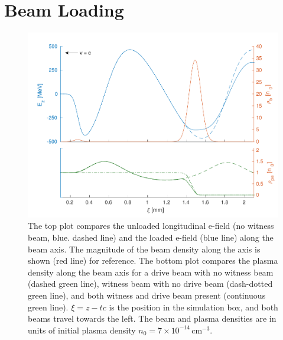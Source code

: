 \documentclass[aps,prstab,reprint,amsmath,amssymb,groupedaddress]{revtex4-1}
\newcommand{\unit}[1]{\,\mathrm{#1}}
\newcommand{\nexp}[1]{\times 10^{#1}}
\begin{document}
\section{Beam Loading}\label{S:BL}

\begin{figure}[hbt]
    \includegraphics[width=\linewidth,trim={2mm 0mm 2mm 0mm},clip]{figures/beamLoading}
    \caption{\label{Fig:BeamLoading} The top plot compares the unloaded longitudinal e-field (no witness beam, blue.
        dashed line) and the loaded e-field (blue line) along the beam axis. The magnitude of the beam density along
        the axis is shown (red line) for reference. The bottom plot compares the plasma density along the beam axis for
        a drive beam with no witness beam (dashed green line), witness beam with no drive beam (dash-dotted green line),
        and both witness and drive beam present (continuous green line). $\xi = z - tc$ is the position in the
        simulation box, and both beams travel towards the left. The beam and plasma densities are in units of initial
        plasma density $n_{0} = 7\nexp{-14}\unit{cm}^{-3}$.}
\end{figure}
\end{document}

